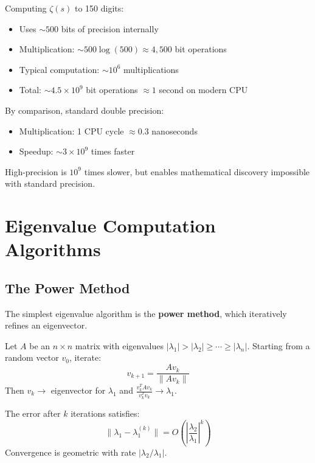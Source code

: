 \begin{example}
Computing $\zeta(s)$ to 150 digits:
\begin{itemize}
\item Uses $\sim 500$ bits of precision internally
\item Multiplication: $\sim 500 \log(500) \approx 4{,}500$ bit operations
\item Typical computation: $\sim 10^6$ multiplications
\item Total: $\sim 4.5 \times 10^9$ bit operations $\approx 1$ second on modern CPU
\end{itemize}

By comparison, standard double precision:
\begin{itemize}
\item Multiplication: 1 CPU cycle $\approx 0.3$ nanoseconds
\item Speedup: $\sim 3 \times 10^9$ times faster
\end{itemize}

High-precision is $10^9$ times slower, but enables mathematical discovery impossible with standard precision.
\end{example}

\section{Eigenvalue Computation Algorithms}
\label{sec:eigenvalue-algorithms}

\subsection{The Power Method}

The simplest eigenvalue algorithm is the \textbf{power method}, which iteratively refines an eigenvector.

\begin{defn}\label{def:power-method}
Let $A$ be an $n \times n$ matrix with eigenvalues $|\lambda_1| > |\lambda_2| \geq \cdots \geq |\lambda_n|$. Starting from a random vector $v_0$, iterate:
\begin{equation}
v_{k+1} = \frac{A v_k}{\|A v_k\|}
\end{equation}
Then $v_k \to$ eigenvector for $\lambda_1$ and $\frac{v_k^T A v_k}{v_k^T v_k} \to \lambda_1$.
\end{defn}

\begin{thm}\label{thm:power-convergence}
The error after $k$ iterations satisfies:
\begin{equation}
\|\lambda_1 - \lambda_1^{(k)}\| = O\left(\left|\frac{\lambda_2}{\lambda_1}\right|^k\right)
\end{equation}
Convergence is geometric with rate $|\lambda_2/\lambda_1|$.
\end{thm}

